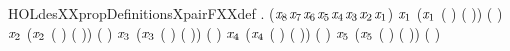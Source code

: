 \begin{SaveVerbatim}{HOLdesXXpropDefinitionsXpairFXXdef}
\HOLTokenTurnstile{} \HOLSymConst{\HOLTokenForall{}} .
        \HOLSymConst{=}
     \HOLTokenLeftbrace{}(\ensuremath{\HOLBoundVar{x}\sb{\mathrm{8}}}\HOLSymConst{,}\ensuremath{\HOLBoundVar{x}\sb{\mathrm{7}}}\HOLSymConst{,}\ensuremath{\HOLBoundVar{x}\sb{\mathrm{6}}}\HOLSymConst{,}\ensuremath{\HOLBoundVar{x}\sb{\mathrm{5}}}\HOLSymConst{,}\ensuremath{\HOLBoundVar{x}\sb{\mathrm{4}}}\HOLSymConst{,}\ensuremath{\HOLBoundVar{x}\sb{\mathrm{3}}}\HOLSymConst{,}\ensuremath{\HOLBoundVar{x}\sb{\mathrm{2}}}\HOLSymConst{,}\ensuremath{\HOLBoundVar{x}\sb{\mathrm{1}}}) \HOLTokenBar{}
       \ensuremath{\HOLBoundVar{x}\sb{\mathrm{1}}} \HOLSymConst{\HOLTokenEor{}}  (\ensuremath{\HOLBoundVar{x}\sb{\mathrm{1}}} \HOLSymConst{\HOLTokenEor{}} ( \HOLSymConst{\HOLTokenExtract{}} ) ( )) \HOLSymConst{=} ( \HOLSymConst{\HOLTokenExtract{}} )  \HOLSymConst{\HOLTokenConj{}}
       \ensuremath{\HOLBoundVar{x}\sb{\mathrm{2}}} \HOLSymConst{\HOLTokenEor{}}  (\ensuremath{\HOLBoundVar{x}\sb{\mathrm{2}}} \HOLSymConst{\HOLTokenEor{}} ( \HOLSymConst{\HOLTokenExtract{}} ) ( )) \HOLSymConst{=} ( \HOLSymConst{\HOLTokenExtract{}} )  \HOLSymConst{\HOLTokenConj{}}
       \ensuremath{\HOLBoundVar{x}\sb{\mathrm{3}}} \HOLSymConst{\HOLTokenEor{}}  (\ensuremath{\HOLBoundVar{x}\sb{\mathrm{3}}} \HOLSymConst{\HOLTokenEor{}} ( \HOLSymConst{\HOLTokenExtract{}} ) ( )) \HOLSymConst{=} ( \HOLSymConst{\HOLTokenExtract{}} )  \HOLSymConst{\HOLTokenConj{}}
       \ensuremath{\HOLBoundVar{x}\sb{\mathrm{4}}} \HOLSymConst{\HOLTokenEor{}}  (\ensuremath{\HOLBoundVar{x}\sb{\mathrm{4}}} \HOLSymConst{\HOLTokenEor{}} ( \HOLSymConst{\HOLTokenExtract{}} ) ( )) \HOLSymConst{=} ( \HOLSymConst{\HOLTokenExtract{}} )  \HOLSymConst{\HOLTokenConj{}}
       \ensuremath{\HOLBoundVar{x}\sb{\mathrm{5}}} \HOLSymConst{\HOLTokenEor{}}  (\ensuremath{\HOLBoundVar{x}\sb{\mathrm{5}}} \HOLSymConst{\HOLTokenEor{}} ( \HOLSymConst{\HOLTokenExtract{}} ) ( )) \HOLSymConst{=} ( \HOLSymConst{\HOLTokenExtract{}} )  \HOLSymConst{\HOLTokenConj{}}

\end{SaveVerbatim}

